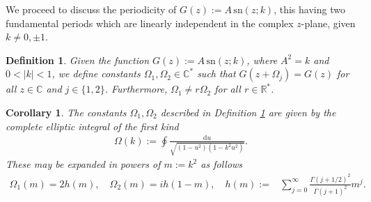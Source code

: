 \documentclass[reqno,a4paper]{amsart}
\numberwithin{equation}{section}
\theoremstyle{plain}
\newtheorem{corollary}[theorem]{Corollary}
\newtheorem{definition}[theorem]{Definition}
\theoremstyle{remark}
\begin{document}
We proceed to discuss the periodicity of $G(z):=A\,\text{sn}(z;k)$, this having two fundamental periods which are linearly independent in the complex $z$-plane, given $k\neq0,\pm1$.
\begin{definition}\label{def:periods}
    Given the function $G(z):=A\,\text{sn}(z;k)$, where $A^2=k$ and $0<|k|<1$, we define constants $\Omega_1,\Omega_2\in\mathbb{C}^*$ such that $G(z+\Omega_j)=G(z)$ for all $z\in\mathbb{C}$ and $j\in\{1,2\}$. Furthermore, $\Omega_1\neq r\Omega_2$ for all $r\in\mathbb{R}^*$.
\end{definition}
\begin{corollary}\label{cor:Periods}
     The constants $\Omega_1,\Omega_2$ described in Definition \ref{def:periods} are given by the complete elliptic integral of the first kind
        \begin{align}\label{int:Omega}
        \Omega(k):=\oint\frac{\text{d}u}{\sqrt{(1-u^2)(1-k^2u^2)}}.
    \end{align}
    These may be expanded in powers of $m:=k^2$ as follows
    \begin{align*}
        \Omega_1(m)=2h(m),\quad\Omega_2(m)=ih(1-m),\quad h(m):=&\sum_{j=0}^{\infty}\frac{\Gamma(j+1/2)^2}{\Gamma(j+1)^2}m^j.
    \end{align*}
\end{corollary}
\end{document}
